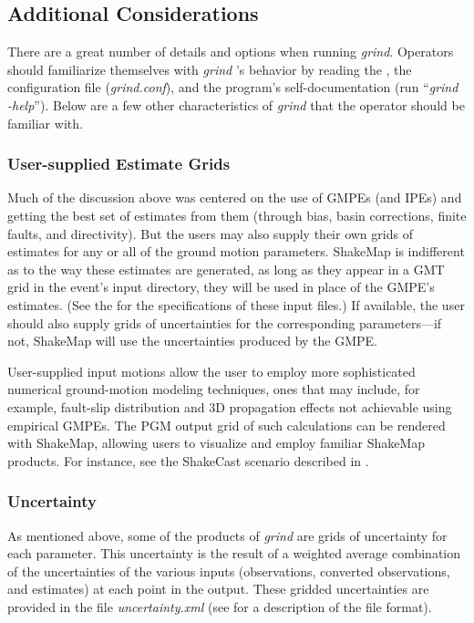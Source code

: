 \documentclass[letterpaper,10pt,english]{sphinxmanual}
\begin{document}
\subsection{Additional Considerations}
\label{tg_processing:additional-considerations}
There are a great number of details and options when running \emph{grind}. Operators should
familiarize themselves with \emph{grind} ’s behavior by reading the {\hyperref[software_guide:sm35\string-software\string-guide]{}},
the configuration file (\emph{grind.conf}), and the program's
self-documentation (run “\emph{grind -help}”).
Below are a few other characteristics of \emph{grind} that the operator should be familiar with.


\subsubsection{User-supplied Estimate Grids}
\label{tg_processing:user-supplied-estimate-grids}
Much of the discussion above was centered on the use of GMPEs (and IPEs) and getting
the best set of estimates from them (through bias, basin corrections, finite faults, and directivity).
But the users may also supply their own grids of estimates for any or all of the ground motion
parameters. ShakeMap is indifferent as to the way these estimates are generated, as long
as they appear in a GMT grid in the event's input directory, they will be used in place of
the GMPE's estimates. (See the {\hyperref[software_guide:sm35\string-software\string-guide]{}} for the
specifications of these input
files.) If available, the user should also supply grids of uncertainties for the corresponding
parameters---if not, ShakeMap will use the uncertainties produced by
the GMPE.

User-supplied input motions allow the user to employ more sophisticated numerical ground-motion
modeling techniques, ones that may include, for example, fault-slip distribution and 3D propagation
effects not achievable using empirical GMPEs. The PGM
output grid of such calculations can be rendered with ShakeMap, allowing users to
visualize and employ familiar ShakeMap products. For instance, see the
ShakeCast scenario described in {\hyperref[shakemap_applications:sec\string-shakemap\string-applications]{}}.


\subsubsection{Uncertainty}
\label{tg_processing:uncertainty}
As mentioned above, some of the products of \emph{grind} are grids of uncertainty for each
parameter. This uncertainty is the result of a weighted average combination of the
uncertainties of the various inputs (observations, converted observations, and estimates)
at each point in the output. These gridded uncertainties are provided in the file
\emph{uncertainty.xml} (see {\hyperref[products:sec\string-interpolated\string-grid\string-file]{}} for a description of the
file format).
\end{document}
